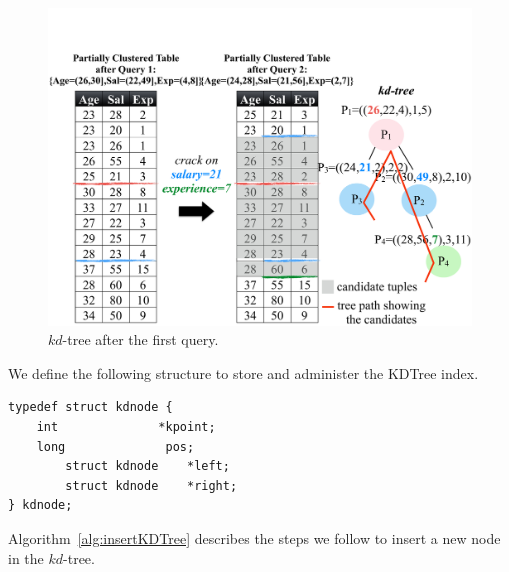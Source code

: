 \begin{figure}[t]
\begin{center}
\vspace*{3\baselineskip}
\includegraphics[trim=0cm 2cm 0cm 8.5cm, width=\columnwidth]{Figures/mcrack_kdtree_2nd}
\caption{$kd$-tree after the first query.}
\label{fig:pkdtree}
\end{center}
\end{figure}


We define the following structure to store and administer the KDTree index.

\lstset{language=C}
\begin{lstlisting}
typedef struct kdnode {
	int              *kpoint;
	long              pos;
        struct kdnode    *left;
        struct kdnode    *right;
} kdnode;
\end{lstlisting}

Algorithm~\ref{alg:insertKDTree} describes the steps we follow to insert a new node in the $kd$-tree.


